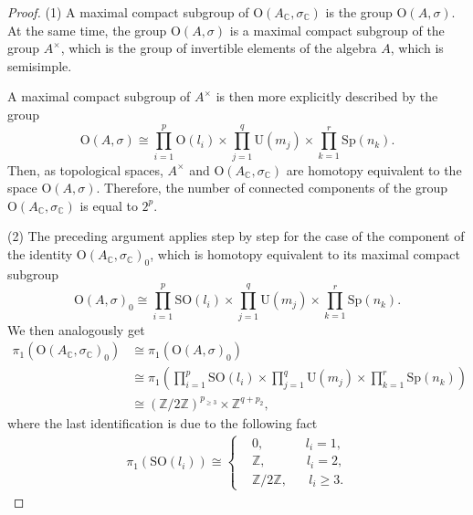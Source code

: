 \documentclass[oneside,11pt]{amsart}
\theoremstyle{definition}
\theoremstyle{remark}
\numberwithin{thm}{section}
\numberwithin{equation}{section}
\begin{document}
\begin{proof}
(1) A maximal compact subgroup of $\mathrm{O}(A_\mathbb{C}, \sigma_{\mathbb{C}})$ is the group $\mathrm{O}(A, \sigma)$. At the same time, the group $\mathrm{O}(A, \sigma)$ is a maximal compact subgroup of the group $A^{\times}$, which is the group of invertible elements of the algebra $A$, which is semisimple.

\noindent A maximal compact subgroup of $A^{\times}$ is then more explicitly described by the  group 
\[\mathrm{O}(A, \sigma) \cong \prod_{i=1}^p \mathrm{O}(l_i) \times \prod_{j=1}^q \mathrm{U}(m_j) \times\prod_{k=1}^r \mathrm{Sp}(n_k).\]
Then, as topological spaces, $A^{\times}$ and $\mathrm{O}(A_\mathbb{C}, \sigma_{\mathbb{C}})$ are homotopy equivalent to the space $\mathrm{O}(A, \sigma)$. Therefore, the number of connected components of the group $\mathrm{O}(A_\mathbb{C}, \sigma_{\mathbb{C}})$ is equal to $2^p$.

(2) The preceding argument applies step by step for the case of the component of the identity $\mathrm{O}(A_\mathbb{C}, \sigma_{\mathbb{C}})_0$, which is homotopy equivalent to its maximal compact subgroup 
\[\mathrm{O}(A, \sigma)_0 \cong \prod_{i=1}^p \mathrm{SO}(l_i) \times \prod_{j=1}^q \mathrm{U}(m_j) \times\prod_{k=1}^r \mathrm{Sp}(n_k).\]  
We then analogously get 
\begin{align*}
\pi_1\left( \mathrm{O}(A_\mathbb{C}, \sigma_{\mathbb{C}})_0\right) & \cong \pi_1\left(\mathrm{O}(A, \sigma)_0\right)\\
& \cong \pi_1\left( \prod_{i=1}^p \mathrm{SO}(l_i) \times \prod_{j=1}^q \mathrm{U}(m_j) \times\prod_{k=1}^r \mathrm{Sp}(n_k)\right)\\
& \cong (\mathbb{Z}/2\mathbb{Z})^{p_{\geq3}}\times \mathbb{Z}^{q+p_2},
\end{align*}
where the last identification is due to the following fact
\begin{align*}
    \pi_1(\mathrm{SO}(l_i))\cong\left\{
   \begin{aligned}
    &0,\hspace{39pt} l_i=1,\\
    &\mathbb{Z},\hspace{38pt} l_i=2,\\
    &\mathbb{Z}/2\mathbb{Z},\hspace{20pt} l_i\geq3.
    \end{aligned}
    \right.
\end{align*}



\end{proof}
\end{document}
